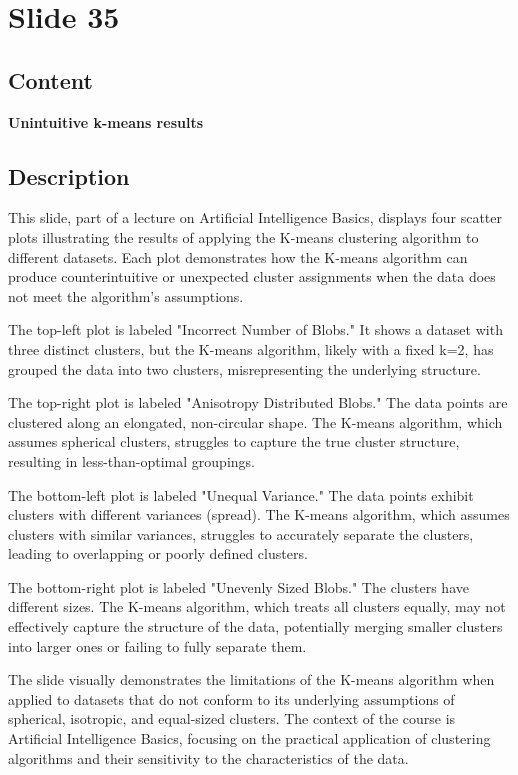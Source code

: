 \documentclass{article}%
\begin{document}
%
\newpage%
\section{Slide 35}%
\label{sec:Slide35}%
\subsection{Content}%

\textbf{Unintuitive k-means results}
%
\subsection{Description}%
This slide, part of a lecture on Artificial Intelligence Basics, displays four scatter plots illustrating the results of applying the K-means clustering algorithm to different datasets.  Each plot demonstrates how the K-means algorithm can produce counterintuitive or unexpected cluster assignments when the data does not meet the algorithm's assumptions.

The top-left plot is labeled "Incorrect Number of Blobs." It shows a dataset with three distinct clusters, but the K-means algorithm, likely with a fixed k=2, has grouped the data into two clusters, misrepresenting the underlying structure.

The top-right plot is labeled "Anisotropy Distributed Blobs."  The data points are clustered along an elongated, non-circular shape.  The K-means algorithm, which assumes spherical clusters, struggles to capture the true cluster structure, resulting in less-than-optimal groupings.

The bottom-left plot is labeled "Unequal Variance."  The data points exhibit clusters with different variances (spread).  The K-means algorithm, which assumes clusters with similar variances, struggles to accurately separate the clusters, leading to overlapping or poorly defined clusters.

The bottom-right plot is labeled "Unevenly Sized Blobs."  The clusters have different sizes.  The K-means algorithm, which treats all clusters equally, may not effectively capture the structure of the data, potentially merging smaller clusters into larger ones or failing to fully separate them.

The slide visually demonstrates the limitations of the K-means algorithm when applied to datasets that do not conform to its underlying assumptions of spherical, isotropic, and equal-sized clusters.  The context of the course is Artificial Intelligence Basics, focusing on the practical application of clustering algorithms and their sensitivity to the characteristics of the data.%
\end{document}
